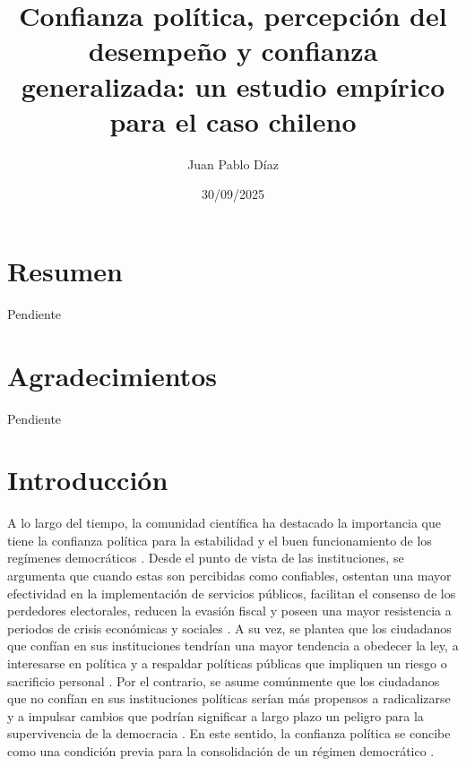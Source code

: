 \documentclass[12pt,twoside]{templates/facsothesis}
\title{Confianza política, percepción del desempeño y confianza generalizada: un estudio empírico para el caso chileno}
\author{Juan Pablo Díaz}
\date{30/09/2025}
\begin{document}

  \maketitle

\frontmatter %
\pagestyle{empty} %



  \setcounter{tocdepth}{1}
  \setlength{\parskip}{0pt}
  \tableofcontents

\setlength\parskip{1em plus 0.1em minus 0.2em}

  \listoftables

  \listoffigures



\mainmatter %
\pagestyle{fancyplain} %

\chapter*{Resumen}\label{resumen}

Pendiente

\chapter*{Agradecimientos}\label{agradecimientos}

Pendiente

\chapter{Introducción}\label{introducciuxf3n}

A lo largo del tiempo, la comunidad científica ha destacado la importancia que tiene la confianza política para la estabilidad y el buen funcionamiento de los regímenes democráticos \citep{zmerliPoliticalTrust2022}. Desde el punto de vista de las instituciones, se argumenta que cuando estas son percibidas como confiables, ostentan una mayor efectividad en la implementación de servicios públicos, facilitan el consenso de los perdedores electorales, reducen la evasión fiscal y poseen una mayor resistencia a periodos de crisis económicas y sociales \citep{vandermeerDeeplyRootedConcern2017, newtonSocialPoliticalTrust2017, citrinPoliticalTrustCynical2018}. A su vez, se plantea que los ciudadanos que confían en sus instituciones tendrían una mayor tendencia a obedecer la ley, a interesarse en política y a respaldar políticas públicas que impliquen un riesgo o sacrificio personal \citep{citrinPoliticalTrustCynical2018, zmerliPoliticalTrust2022}. Por el contrario, se asume comúnmente que los ciudadanos que no confían en sus instituciones políticas serían más propensos a radicalizarse y a impulsar cambios que podrían significar a largo plazo un peligro para la supervivencia de la democracia \citep{andersonSensitiveLeftImpervious2008}. En este sentido, la confianza política se concibe como una condición previa para la consolidación de un régimen democrático \citep{vandermeerDeeplyRootedConcern2017}.
\end{document}
